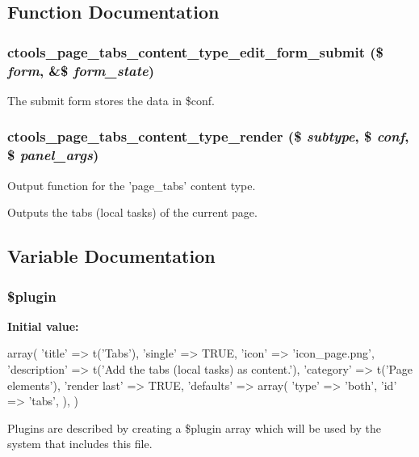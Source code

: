 \subsection{Function Documentation}
\hypertarget{page__tabs_8inc_af19d945db367ac5431f0e53b204ff621}{
\subsubsection[{ctools\_\-page\_\-tabs\_\-content\_\-type\_\-edit\_\-form\_\-submit}]{\setlength{\rightskip}{0pt plus 5cm}ctools\_\-page\_\-tabs\_\-content\_\-type\_\-edit\_\-form\_\-submit (\$ {\em form}, \/  \&\$ {\em form\_\-state})}}
\label{page__tabs_8inc_af19d945db367ac5431f0e53b204ff621}
The submit form stores the data in \$conf. \hypertarget{page__tabs_8inc_a8d5cf78bcb19f75cce8dec6726d2a3ca}{
\subsubsection[{ctools\_\-page\_\-tabs\_\-content\_\-type\_\-render}]{\setlength{\rightskip}{0pt plus 5cm}ctools\_\-page\_\-tabs\_\-content\_\-type\_\-render (\$ {\em subtype}, \/  \$ {\em conf}, \/  \$ {\em panel\_\-args})}}
\label{page__tabs_8inc_a8d5cf78bcb19f75cce8dec6726d2a3ca}
Output function for the 'page\_\-tabs' content type.

Outputs the tabs (local tasks) of the current page. 

\subsection{Variable Documentation}
\hypertarget{page__tabs_8inc_ada8a7130088351710bb02ed622d6bf65}{
\subsubsection[{\$plugin}]{\setlength{\rightskip}{0pt plus 5cm}\$plugin}}
\label{page__tabs_8inc_ada8a7130088351710bb02ed622d6bf65}
{\bfseries Initial value:}
\begin{DoxyCode}
 array(
  'title' => t('Tabs'),
  'single' => TRUE,
  'icon' => 'icon_page.png',
  'description' => t('Add the tabs (local tasks) as content.'),
  'category' => t('Page elements'),
  'render last' => TRUE,
  'defaults' => array(
    'type' => 'both',
    'id' => 'tabs',
  ),
)
\end{DoxyCode}
Plugins are described by creating a \$plugin array which will be used by the system that includes this file. 
